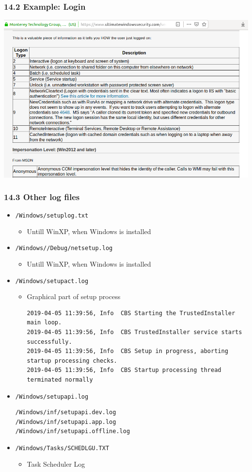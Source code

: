 \begin{frame}[fragile]
  \frametitle{14.2 Example: Login}
    \includegraphics[scale=0.4]{images/f14_logonType.png}
\end{frame}


\begin{frame}[fragile]
  \frametitle{14.3 Other log files}
    \begin{itemize}
	\item \texttt{/Windows/setuplog.txt}
        \begin{itemize}
            \item Untill WinXP, when Windows is installed
        \end{itemize}
	\item \texttt{/Windows//Debug/netsetup.log}
        \begin{itemize}
            \item Untill WinXP, when Windows is installed
        \end{itemize}
	\item \texttt{/Windows/setupact.log}
        \begin{itemize}
            \item Graphical part of setup process
  \begin{lstlisting}[basicstyle=\tiny]
2019-04-05 11:39:56, Info  CBS Starting the TrustedInstaller main loop.
2019-04-05 11:39:56, Info  CBS TrustedInstaller service starts successfully.
2019-04-05 11:39:56, Info  CBS Setup in progress, aborting startup processing checks.
2019-04-05 11:39:56, Info  CBS Startup processing thread terminated normally
    \end{lstlisting}
	\end{itemize}
	\item \texttt{/Windows/setupapi.log}
  \begin{lstlisting}[basicstyle=\tiny]
/Windows/inf/setupapi.dev.log
/Windows/inf/setupapi.app.log
/Windows/inf/setupapi.offline.log
    \end{lstlisting}
	\item \texttt{/Windows/Tasks/SCHEDLGU.TXT}
        \begin{itemize}
            \item Task Scheduler Log
	\end{itemize}
    \end{itemize}
\end{frame}


